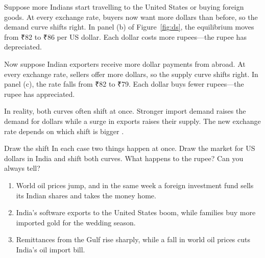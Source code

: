 Suppose more Indians start travelling to the United States or buying foreign goods. At every exchange rate, buyers now want more dollars than before, so the demand curve shifts right. In panel (b) of Figure~\ref{fig:ds}, the equilibrium moves from ₹82 to ₹86 per US dollar. Each dollar costs more rupees---the rupee has depreciated.

Now suppose Indian exporters receive more dollar payments from abroad. At every exchange rate, sellers offer more dollars, so the supply curve shifts right. In panel (c), the rate falls from ₹82 to ₹79. Each dollar buys fewer rupees---the rupee has appreciated.

In reality, both curves often shift at once. Stronger import demand raises the demand for dollars while a surge in exports raises their supply. The new exchange rate depends on which shift is bigger .

\begin{exercise}{Draw the shift}
In each case two things happen at once. Draw the market for US dollars in India and shift both curves. What happens to the rupee? Can you always tell?
\begin{enumerate}[label=(\alph*), leftmargin=2em]
  \item World oil prices jump, and in the same week a foreign investment fund sells its Indian shares and takes the money home.
  \item India's software exports to the United States boom, while families buy more imported gold for the wedding season.
  \item Remittances from the Gulf rise sharply, while a fall in world oil prices cuts India's oil import bill.
\end{enumerate}
\end{exercise}
